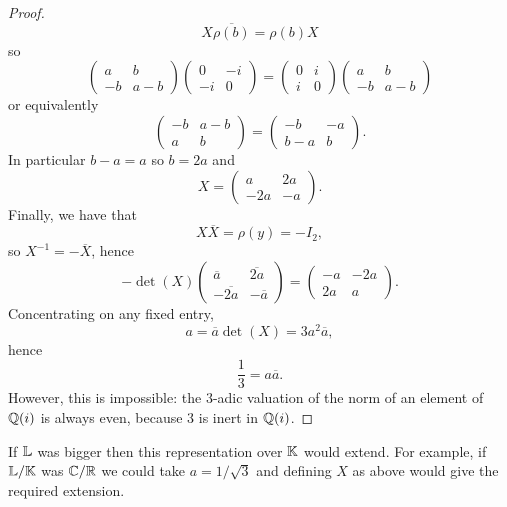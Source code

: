 \begin{proof}
\[
X \overline{\rho(b)} = \rho(b) X
\]
so
\[
\begin{pmatrix} a & b \\ -b & a-b \end{pmatrix} \begin{pmatrix} 0 & -i \\ -i & 0 \end{pmatrix}
=
\begin{pmatrix} 0 & i \\ i & 0 \end{pmatrix} \begin{pmatrix} a & b \\ -b & a-b \end{pmatrix}
\]
or equivalently
\[
\begin{pmatrix} -b & a-b \\ a & b \end{pmatrix} = \begin{pmatrix} -b & -a \\ b-a & b \end{pmatrix}.
\]
In particular $b -a =a$ so $b = 2a$ and
\[
X = \begin{pmatrix} a & 2a \\ -2a & -a \end{pmatrix}.
\]
Finally, we have that
\[
X \overline{X} = \rho(y) = -I_2,
\]
so $X^{-1} = - \overline{X}$, hence
\[
- \det(X) \begin{pmatrix} \overline{a} & \overline{2a} \\ -\overline{2a} & -\overline{a} \end{pmatrix} = \begin{pmatrix} -a & -2a \\ 2a & a \end{pmatrix}.
\]
Concentrating on any fixed entry,
\[
a = \overline{a} \det(X) = 3 a^2 \overline{a},
\]
hence
\[
\frac{1}{3} = a \overline{a}.
\]
However, this is impossible: the $3$-adic valuation of the norm of an element of ${\mathbb Q}(i)$ is always even, because $3$ is inert in ${\mathbb Q}(i)$.
\end{proof}

\begin{remark}
If ${\mathbb L}$ was bigger then this representation over ${\mathbb K}$ would extend. For example, if ${\mathbb L} / {\mathbb K}$ was ${\mathbb C} / {\mathbb R}$ we could take $a = 1 / \sqrt{3}$ and defining $X$ as above would give the required extension.
\end{remark}

